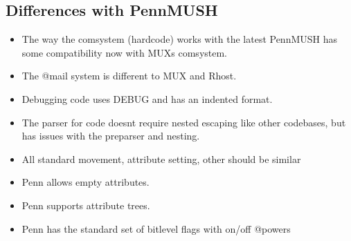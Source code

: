 \documentclass[letterpaper,10pt,english]{sphinxmanual}
\begin{document}
\subsection{Differences with PennMUSH}
\label{\detokenize{differences:differences-with-pennmush}}\begin{itemize}
\item {} 
\sphinxAtStartPar
The way the comsystem (hardcode) works with the latest PennMUSH has some
compatibility now with MUX\textquotesingle{}s comsystem.

\item {} 
\sphinxAtStartPar
The @mail system is different to MUX and Rhost.

\item {} 
\sphinxAtStartPar
Debugging code uses DEBUG and has an indented format.

\item {} 
\sphinxAtStartPar
The parser for code doesn\textquotesingle{}t require nested escaping like other codebases, but has issues with the pre\sphinxhyphen{}parser and nesting.

\item {} 
\sphinxAtStartPar
All standard movement, attribute setting, other should be similar

\item {} 
\sphinxAtStartPar
Penn allows empty attributes.

\item {} 
\sphinxAtStartPar
Penn supports attribute trees.

\item {} 
\sphinxAtStartPar
Penn has the standard set of bitlevel flags with on/off @powers

\end{itemize}
\end{document}
